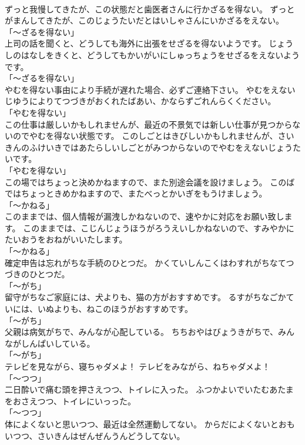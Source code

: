 \documentclass[8pt]{extreport}
\begin{document}
\begin{CJK}{UTF8}{min}
\\	ずっと我慢してきたが、この状態だと歯医者さんに行かざるを得ない。	ずっとがまんしてきたが、このじょうたいだとはいしゃさんにいかざるをえない。	
\\	「～ざるを得ない」	
\\	上司の話を聞くと、どうしても海外に出張をせざるを得ないようです。	じょうしのはなしをきくと、どうしてもかいがいにしゅっちょうをせざるをえないようです。	
\\	「～ざるを得ない」	
\\	やむを得ない事由により手続が遅れた場合、必ずご連絡下さい。	やむをえないじゆうによりてつづきがおくれたばあい、かならずごれんらくください。	
\\	「やむを得ない」	
\\	この仕事は厳しいかもしれませんが、最近の不景気では新しい仕事が見つからないのでやむを得ない状態です。	このしごとはきびしいかもしれませんが、さいきんのふけいきではあたらしいしごとがみつからないのでやむをえないじょうたいです。	
\\	「やむを得ない」	
\\	この場ではちょっと決めかねますので、また別途会議を設けましょう。	このばではちょっときめかねますので、またべっとかいぎをもうけましょう。	
\\	「～かねる」	
\\	このままでは、個人情報が漏洩しかねないので、速やかに対応をお願い致します。	このままでは、こじんじょうほうがろうえいしかねないので、すみやかにたいおうをおねがいいたします。	
\\	「～かねる」	
\\	確定申告は忘れがちな手続のひとつだ。	かくていしんこくはわすれがちなてつづきのひとつだ。	
\\	「～がち」	
\\	留守がちなご家庭には、犬よりも、猫の方がおすすめです。	るすがちなごかていには、いぬよりも、ねこのほうがおすすめです。	
\\	「～がち」	
\\	父親は病気がちで、みんなが心配している。	ちちおやはびょうきがちで、みんながしんぱいしている。	
\\	「～がち」	
\\	テレビを見ながら、寝ちゃダメよ！	テレビをみながら、ねちゃダメよ！	
\\	「～つつ」	
\\	二日酔いで痛む頭を押さえつつ、トイレに入った。	ふつかよいでいたむあたまをおさえつつ、トイレにいっった。	
\\	「～つつ」	
\\	体によくないと思いつつ、最近は全然運動してない。	からだによくないとおもいつつ、さいきんはぜんぜんうんどうしてない。	

\end{CJK}
\end{document}
